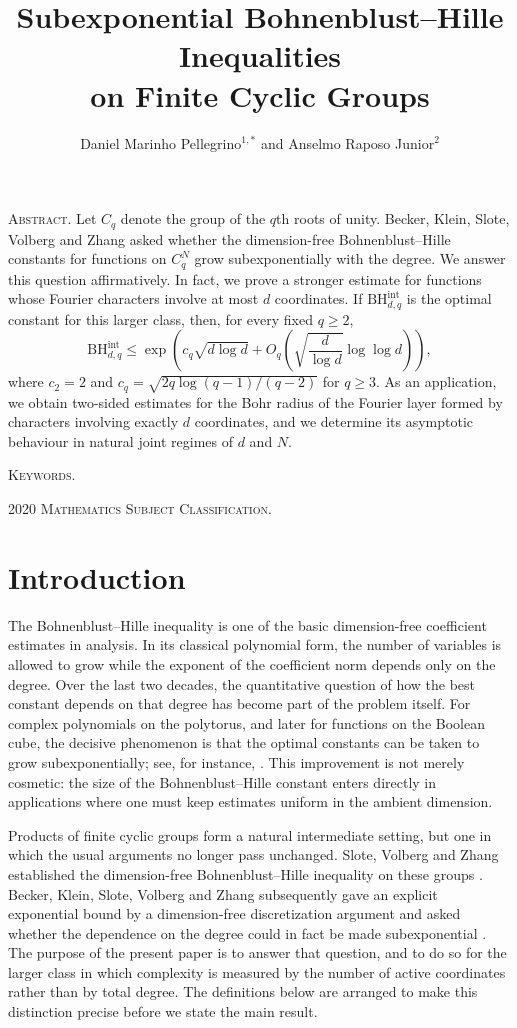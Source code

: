 \documentclass[11pt,a4paper]{article}
\title{Subexponential Bohnenblust--Hille Inequalities\\on Finite Cyclic Groups}
\author{Daniel Marinho Pellegrino$^{1,*}$ and Anselmo Raposo Junior$^{2}$}
\makeatletter
\numberwithin{equation}{section}
\theoremstyle{cleanplain}
\theoremstyle{cleandefinition}
\theoremstyle{cleanremark}
\newcommand{\BHint}[2]{\mathrm{BH}^{\mathrm{int}}_{#1,#2}}
\newcommand{\@address}{}
\newcommand{\@email}{}
\newcommand{\@subjclass}{}
\newcommand{\@keywords}{}
\newcommand{\@status}{}
\renewcommand{\maketitle}{%
  \begin{center}
    \vspace*{0.4em}
    {\LARGE\scshape \@title\par}
    \vspace{1.25em}
    {\normalsize\scshape \@author\par}
    \vspace{0.45em}
    {\small \@address\par}
    \ifdefempty{\@email}{}{\vspace{0.2em}{\small\texttt{\@email}\par}}
    \ifdefempty{\@status}{}{\vspace{0.55em}{\small\itshape\color{black}\@status\par}}
  \end{center}
  \vspace{1.0em}
}
\renewenvironment{abstract}
  {\begin{center}\begin{minipage}{0.91\textwidth}\small
   \noindent\textsc{Abstract.}\enspace}
  {\end{minipage}\end{center}\vspace{0.65em}}
\newcommand{\makefrontmatterdetails}{%
  \begin{center}
  \begin{minipage}{0.91\textwidth}
  \small\noindent\textsc{Keywords.}\enspace\@keywords\par
  \vspace{0.25em}
  \noindent\textsc{2020 Mathematics Subject Classification.}\enspace\@subjclass
  \end{minipage}
  \end{center}
  \vspace{0.75em}
}
\makeatother
\begin{document}
\maketitle

\begin{abstract}
Let $C_q$ denote the group of the $q$th roots of unity.  Becker, Klein,
Slote, Volberg and Zhang asked whether the dimension-free
Bohnenblust--Hille constants for functions on $C_q^N$ grow
subexponentially with the degree.  We answer this question affirmatively.
In fact, we prove a stronger estimate for functions whose Fourier characters
involve at most $d$ coordinates.  If $\BHint{d}{q}$ is the optimal constant
for this larger class, then, for every fixed $q\geq2$,
\[
 \BHint{d}{q}\leq
 \exp\left(
 c_q\sqrt{d\log d}
 +O_q\left(\sqrt{\frac d{\log d}}\log\log d\right)
 \right),
\]
where $c_2=2$ and
$c_q=\sqrt{2q\log(q-1)/(q-2)}$ for $q\geq3$.
As an application, we obtain two-sided estimates for the Bohr radius of the
Fourier layer formed by characters involving exactly $d$ coordinates, and
we determine its asymptotic behaviour in natural joint regimes of $d$ and
$N$.
\end{abstract}
\makefrontmatterdetails
\clearpage

\begingroup
\setcounter{tocdepth}{2}
\small
\tableofcontents
\endgroup
\clearpage

\section{Introduction}\label{sec:introduction}

{\color{black}
The Bohnenblust--Hille inequality is one of the basic dimension-free
coefficient estimates in analysis.  In its classical polynomial form, the
number of variables is allowed to grow while the exponent of the coefficient
norm depends only on the degree.  Over the last two decades, the quantitative
question of how the best constant depends on that degree has become part of
the problem itself.  For complex polynomials on the polytorus, and later for
functions on the Boolean cube, the decisive phenomenon is that the optimal
constants can be taken to grow subexponentially; see, for instance,
\cite{BPSS,DMP}.  This improvement is not merely cosmetic: the size of the
Bohnenblust--Hille constant enters directly in applications where one must
keep estimates uniform in the ambient dimension.

Products of finite cyclic groups form a natural intermediate setting, but one
in which the usual arguments no longer pass unchanged.  Slote, Volberg and
Zhang established the dimension-free Bohnenblust--Hille inequality on these
groups \cite{SVZ}.  Becker, Klein, Slote, Volberg and Zhang subsequently gave
an explicit exponential bound by a dimension-free discretization argument
and asked whether the dependence on the degree could in fact be made
subexponential \cite{BKSVZ}.  The purpose of the present paper is to answer
that question, and to do so for the larger class in which complexity is
measured by the number of active coordinates rather than by total degree.
The definitions below are arranged to make this distinction precise before
we state the main result.
}
\end{document}
